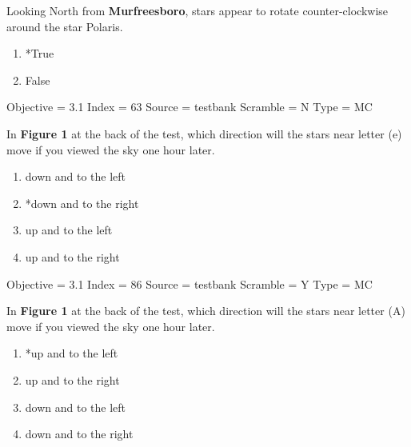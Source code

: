 \documentclass[11pt]{article}
\begin{document}
\begin{enumerate}
\begin{minipage}{\textwidth}
\begin{minipage}{\textwidth}
\item Looking North from {\bf Murfreesboro}, stars appear to rotate counter-clockwise around the star Polaris.
\begin{multicols}{3}
\begin{enumerate} 
\setlength{\itemsep}{1pt} 
\setlength{\parskip}{0pt} 
\setlength{\parsep}{0pt}
\setlength{\multicolsep}{1pt} 
\item *True
\item False
\end{enumerate} 
\vfill 
\end{multicols}

Objective = 3.1
Index = 63
Source = testbank
Scramble = N
Type = MC
\end{minipage}
\end{minipage}
\vskip 0.20in

\begin{minipage}{\textwidth}
\begin{minipage}{\textwidth}
\item In {\bf Figure 1} at the back of the test, which direction will the stars near letter (e) move if you viewed the sky one hour later.
\begin{multicols}{2}
\begin{enumerate} 
\setlength{\itemsep}{1pt} 
\setlength{\parskip}{0pt} 
\setlength{\parsep}{0pt}
\setlength{\multicolsep}{1pt} 
\item down and to the left
\item *down and to the right
\item up and to the left
\item up and to the right
\end{enumerate} 
\vfill 
\end{multicols}

Objective = 3.1
Index = 86
Source = testbank
Scramble = Y
Type = MC
\end{minipage}
\end{minipage}
\vskip 0.20in

\begin{minipage}{\textwidth}
\begin{minipage}{\textwidth}
\item In {\bf Figure 1} at the back of the test, which direction will the stars near letter (A) move if you viewed the sky one hour later.
\begin{multicols}{2}
\begin{enumerate} 
\setlength{\itemsep}{1pt} 
\setlength{\parskip}{0pt} 
\setlength{\parsep}{0pt}
\setlength{\multicolsep}{1pt} 
\item *up and to the left
\item up and to the right
\item down and to the left
\item down and to the right
\end{enumerate} 
\vfill 
\end{multicols}


\end{minipage}
\end{minipage}
\end{enumerate}
\end{document}
